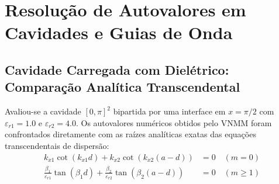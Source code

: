 \documentclass[11pt,a4paper]{article}
\begin{document}
\section{Resolu\c{c}\~ao de Autovalores em Cavidades e Guias de Onda}

\subsection{Cavidade Carregada com Diel\'etrico: Compara\c{c}\~ao Anal\'itica Transcendental}
Avaliou-se a cavidade $[0, \pi]^2$ bipartida por uma interface em $x = \pi/2$ com $\varepsilon_{r1} = 1.0$ e $\varepsilon_{r2} = 4.0$. Os autovalores num\'ericos obtidos pelo VNMM foram confrontados diretamente com as ra\'izes anal\'iticas exatas das equa\c{c}\~oes transcendentais de dispers\~ao:
\begin{align}
k_{x1} \cot(k_{x1} d) + k_{x2} \cot(k_{x2} (a - d)) &= 0 \quad (m = 0) \\
\frac{\beta_1}{\varepsilon_{r1}} \tan(\beta_1 d) + \frac{\beta_2}{\varepsilon_{r2}} \tan(\beta_2 (a - d)) &= 0 \quad (m \ge 1)
\end{align}

\begin{table}[H]
\centering
\caption{Compara\c{c}\~ao entre autovalores do VNMM 2D e solu\c{c}\~oes anal\'iticas exatas para os primeiros 8 modos ressonantes $\mathrm{TE}_z$.}
\label{tab:cavity}
\end{table}
\end{document}

